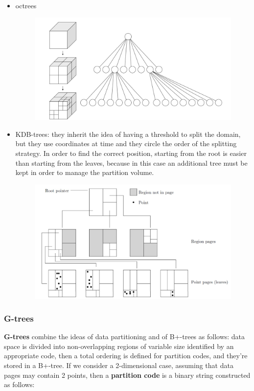 \begin{itemize}
    
    \newpage
    \item octrees

    \begin{figure}[H]
		\centering
		\includegraphics[scale = 0.5]{img/part3.jpg}
		\label{part3}
    \end{figure}

    \item KDB-trees: they inherit the idea of having a threshold to split the domain, but they use coordinates at time and they circle the order of the splitting strategy. In order to find the correct position, starting from the root is easier than starting from the leaves, because in this case an additional tree must be kept in order to manage the partition volume.

    \begin{figure}[h!]
		\centering
		\includegraphics[scale = 0.7]{img/part4.jpg}
		\label{part4}
    \end{figure}
    
\end{itemize}

\subsubsection{G-trees}
\textbf{G-trees} combine the ideas of data partitioning and of B+-trees as follows: data space is divided into non-overlapping regions of variable size identified by an appropriate code, then a total ordering is defined for partition codes, and they're stored in a B+-tree. If we consider a 2-dimensional case, assuming that data pages may contain 2 points, then a \textbf{partition code} is a binary string constructed as follows:

